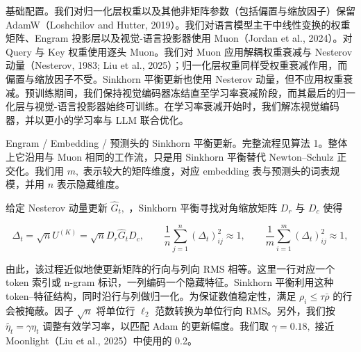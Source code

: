 基础配置。我们对归一化层权重以及其他非矩阵参数（包括偏置与缩放因子）保留 AdamW（Loshchilov and Hutter, 2019）。我们对语言模型主干中线性变换的权重矩阵、Engram 投影层以及视觉-语言投影器使用 Muon（Jordan et al., 2024）。对 Query 与 Key 权重使用逐头 Muon。我们对 Muon 应用解耦权重衰减与 Nesterov 动量（Nesterov, 1983; Liu et al., 2025）；归一化层权重同样受权重衰减作用，而偏置与缩放因子不受。Sinkhorn 平衡更新也使用 Nesterov 动量，但不应用权重衰减。预训练期间，我们保持视觉编码器冻结直至学习率衰减阶段，而其最后的归一化层与视觉-语言投影器始终可训练。在学习率衰减开始时，我们解冻视觉编码器，并以更小的学习率与 LLM 联合优化。

Engram / Embedding / 预测头的 Sinkhorn 平衡更新。完整流程见算法 1。整体上它沿用与 Muon 相同的工作流，只是用 Sinkhorn 平衡替代 Newton--Schulz 正交化。我们用 \(m ,\) 表示较大的矩阵维度，对应 embedding 表与预测头的词表规模，并用 \(n\) 表示隐藏维度。

给定 Nesterov 动量更新 \(\widehat { G } _ { t } ,\) ，Sinkhorn 平衡寻找对角缩放矩阵 \(D _ { r }\) 与 \(D _ { c }\) 使得

\[
\Delta _ { t } = \sqrt { n } U ^ { ( K ) } = \sqrt { n } D _ { r } \widehat { G } _ { t } D _ { c } , \qquad \frac { 1 } { n } \sum _ { j = 1 } ^ { n } ( \Delta _ { t } ) _ { i j } ^ { 2 } \approx 1 , \qquad \frac { 1 } { m } \sum _ { i = 1 } ^ { m } ( \Delta _ { t } ) _ { i j } ^ { 2 } \approx 1 ,\tag{7}
\]

由此，该过程近似地使更新矩阵的行向与列向 RMS 相等。这里一行对应一个 token 索引或 n-gram 标识，一列编码一个隐藏特征。Sinkhorn 平衡利用这种 token--特征结构，同时沿行与列做归一化。为保证数值稳定性，满足 \(\rho _ { i } \leqslant \tau \bar { \rho }\) 的行会被掩蔽。因子 \(\sqrt { n }\) 将单位行 \(\ell _ { 2 }\) 范数转换为单位行向 RMS。另外，我们按 \(\widetilde { \eta _ { t } } = \gamma \eta _ { t }\) 调整有效学习率，以匹配 Adam 的更新幅度。我们取 \(\gamma = 0 . 1 8 ,\) 接近 Moonlight（Liu et al., 2025）中使用的 0.2。

